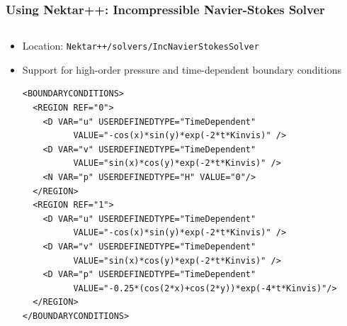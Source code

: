 \documentclass{beamer}
\numberwithin{figure}{section}
\numberwithin{equation}{section}
\begin{document}
\begin{frame}[fragile]
\frametitle{Using Nektar++: Incompressible Navier-Stokes Solver}
\begin{minipage}[c][0.8\textheight][t]{\linewidth}
\begin{columns}
\begin{column}[l]{11.5cm}
\begin{itemize}
  \item Location: \texttt{Nektar++/solvers/IncNavierStokesSolver}
  \item Support for high-order pressure and time-dependent boundary conditions
  \begin{lstlisting}
<BOUNDARYCONDITIONS>
  <REGION REF="0">
    <D VAR="u" USERDEFINEDTYPE="TimeDependent" 
          VALUE="-cos(x)*sin(y)*exp(-2*t*Kinvis)" />
    <D VAR="v" USERDEFINEDTYPE="TimeDependent" 
          VALUE="sin(x)*cos(y)*exp(-2*t*Kinvis)" />
    <N VAR="p" USERDEFINEDTYPE="H" VALUE="0"/>
  </REGION>
  <REGION REF="1">
    <D VAR="u" USERDEFINEDTYPE="TimeDependent" 
          VALUE="-cos(x)*sin(y)*exp(-2*t*Kinvis)" />
    <D VAR="v" USERDEFINEDTYPE="TimeDependent" 
          VALUE="sin(x)*cos(y)*exp(-2*t*Kinvis)" />
    <D VAR="p" USERDEFINEDTYPE="TimeDependent" 
          VALUE="-0.25*(cos(2*x)+cos(2*y))*exp(-4*t*Kinvis)"/>
  </REGION>
</BOUNDARYCONDITIONS>
  \end{lstlisting}
\end{itemize}
\end{column}
\end{columns}
\end{minipage}
\end{frame}

% 
\end{document}
